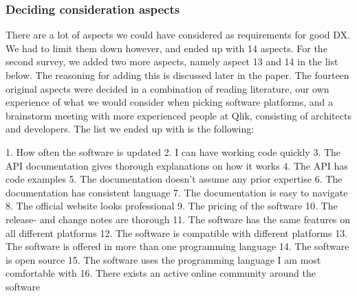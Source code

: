\documentclass[11pt]{article}
\begin{document}
\begin{multicols}{2}
    \subsubsection{Deciding consideration aspects}

    There are a lot of aspects we could have considered as requirements for
    good DX. We had to limit them down however, and ended up with 14 aspects.
    For the second survey, we added two more aspects, namely aspect 13 and 14 in the list below.
    The reasoning for adding this is
    discussed later in the paper. The fourteen original aspects were decided in a combination
    of reading literature, our own experience of what we would consider when
    picking software platforms, and a brainstorm meeting with more experienced
    people at Qlik, consisting of architects and developers.
    The list we ended up with is the following:

    1. How often the software is updated
    2. I can have working code quickly
    3. The API documentation gives thorough explanations on how it works
    4. The API has code examples
    5. The documentation doesn't assume any prior expertise
    6. The documentation has consistent language
    7. The documentation is easy to navigate
    8. The official website looks professional
    9. The pricing of the software
    10. The release- and change notes are thorough
    11. The software has the same features on all different platforms
    12. The software is compatible with different platforms
    13. The software is offered in more than one programming language
    14. The software is open source
    15. The software uses the programming language I am most comfortable with
    16. There exists an active online community around the software


\end{multicols}
\end{document}
